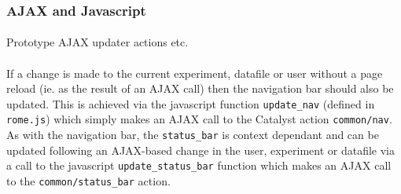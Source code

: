 \subsubsection{AJAX and Javascript}
\label{sec:view_javascript}

\paragraph{}
Prototype AJAX updater actions etc.

\paragraph{}
If a change is made to the current experiment, datafile or user without a page reload (ie. as the result of an AJAX call) then the navigation bar should also be updated. This is achieved via the javascript function \texttt{update\_nav} (defined in \texttt{rome.js}) which simply makes an AJAX call to the Catalyst action \texttt{common/nav}.  As with the navigation bar, the \texttt{status\_bar} is context dependant and can be updated following an AJAX-based change in the user, experiment or datafile via a call to the javascript \texttt{update\_status\_bar} function which makes an AJAX call to the \texttt{common/status\_bar} action.

